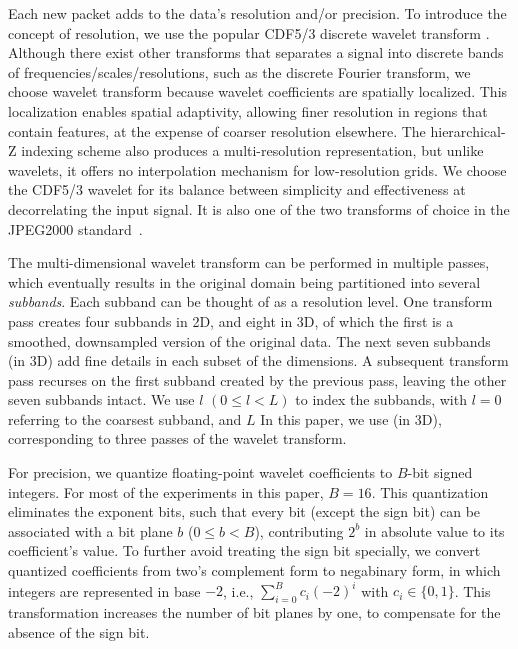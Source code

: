 Each new packet adds to the data's resolution and/or precision. To introduce
the concept of resolution, we use the popular CDF5/3 discrete wavelet transform
\todo{[CITE]}.  Although there exist other transforms that separates a signal
into discrete bands of frequencies/scales/resolutions, such as the discrete
Fourier transform, we choose wavelet transform because wavelet coefficients are
spatially localized. This localization enables spatial adaptivity, allowing
finer resolution in regions that contain  
features, at the expense of coarser resolution elsewhere. The hierarchical-Z
indexing scheme \todo{[CITE]} also produces a multi-resolution representation,
but unlike wavelets, it offers no interpolation mechanism for low-resolution
grids. We choose the CDF5/3 wavelet for its balance between simplicity and
effectiveness at decorrelating the input signal. It is also one of the two
transforms of choice in the JPEG2000 standard~\cite{jpeg2001}.

The  multi-dimensional wavelet transform can be performed in
multiple passes, which eventually results in the original domain being
partitioned into several \emph{subbands}. Each subband can be thought of as a
resolution level. One transform pass creates four subbands in 2D, and eight in
3D, of which the first is a smoothed, downsampled version of the original data.
The next seven subbands (in 3D) add fine details in each subset of the
dimensions. A subsequent transform pass  recurses on the first
subband created by the previous pass, leaving the other seven subbands intact.
We  use $l$ $(0 \leq l < L)$ to index the subbands, with $l =
0$ referring to the coarsest subband, and $L$   In this paper, we use
  (in 3D), corresponding to three passes of the
wavelet transform. 

For  precision, we quantize
floating-point wavelet coefficients to $B$-bit signed integers. For most of the
experiments in this paper, $B=16$. This quantization eliminates the exponent
bits, such that every bit (except the sign bit) can be associated with a bit
plane $b$ ($0\leq b < B$), contributing $2^b$ in absolute value to its
coefficient's value. To further avoid treating the sign bit specially, we
convert quantized coefficients from two's complement form to negabinary form,
in which integers are represented in base $-2$, i.e.,
$\sum_{i=0}^{B}{c_i(-2)^i}$ with $c_i\in \{0,1\}$. This transformation
increases the number of bit planes by one, to compensate for the absence of the
sign bit.    

